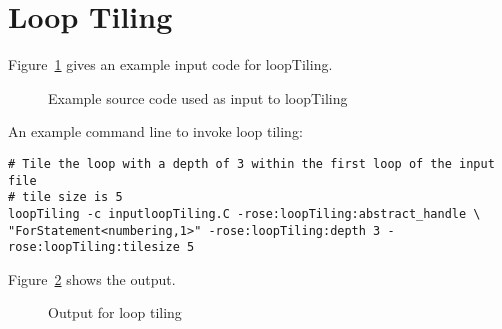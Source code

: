 \clearpage
\section{Loop Tiling}
Figure~\ref{Tutorial:exampleInputCode_LoopTilingp} gives an example
input code for loopTiling.

\begin{figure}[!h]
{\indent
  {\mySmallFontSize
      \begin{latexonly}
    
    \end{latexonly}
      \begin{htmlonly}
    
    \end{htmlonly}
  }
}
\caption{Example source code used as input to loopTiling}
    \label{Tutorial:exampleInputCode_LoopTilingp}
\end{figure}


An example command line to invoke loop tiling:
\begin{verbatim}
# Tile the loop with a depth of 3 within the first loop of the input file 
# tile size is 5
loopTiling -c inputloopTiling.C -rose:loopTiling:abstract_handle \
"ForStatement<numbering,1>" -rose:loopTiling:depth 3 -rose:loopTiling:tilesize 5

\end{verbatim}
Figure~\ref{Tutorial:exampleOutput_LoopTilingp} shows the output.
\begin{figure}[!h]
{\indent
  {\mySmallFontSize
      \begin{latexonly}
    
    \end{latexonly}
      \begin{htmlonly}
    
    \end{htmlonly}
  }
}
\caption{Output for loop tiling}
    \label{Tutorial:exampleOutput_LoopTilingp}
\end{figure}


